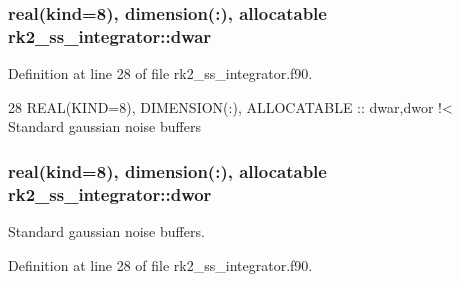 \subsubsection[{\texorpdfstring{dwar}{dwar}}]{\setlength{\rightskip}{0pt plus 5cm}real(kind=8), dimension(\+:), allocatable rk2\+\_\+ss\+\_\+integrator\+::dwar\hspace{0.3cm}{\ttfamily [private]}}\hypertarget{namespacerk2__ss__integrator_aa9dc56a3ff3887caced809dcb0257a1b}{}\label{namespacerk2__ss__integrator_aa9dc56a3ff3887caced809dcb0257a1b}


Definition at line 28 of file rk2\+\_\+ss\+\_\+integrator.\+f90.


\begin{DoxyCode}
28   \textcolor{keywordtype}{REAL(KIND=8)}, \textcolor{keywordtype}{DIMENSION(:)}, \textcolor{keywordtype}{ALLOCATABLE} :: dwar,dwor\textcolor{comment}{ !< Standard gaussian noise buffers}
\end{DoxyCode}
\subsubsection[{\texorpdfstring{dwor}{dwor}}]{\setlength{\rightskip}{0pt plus 5cm}real(kind=8), dimension(\+:), allocatable rk2\+\_\+ss\+\_\+integrator\+::dwor\hspace{0.3cm}{\ttfamily [private]}}\hypertarget{namespacerk2__ss__integrator_aeae3507fa2e319b59923f21622b58fc7}{}\label{namespacerk2__ss__integrator_aeae3507fa2e319b59923f21622b58fc7}


Standard gaussian noise buffers. 



Definition at line 28 of file rk2\+\_\+ss\+\_\+integrator.\+f90.

